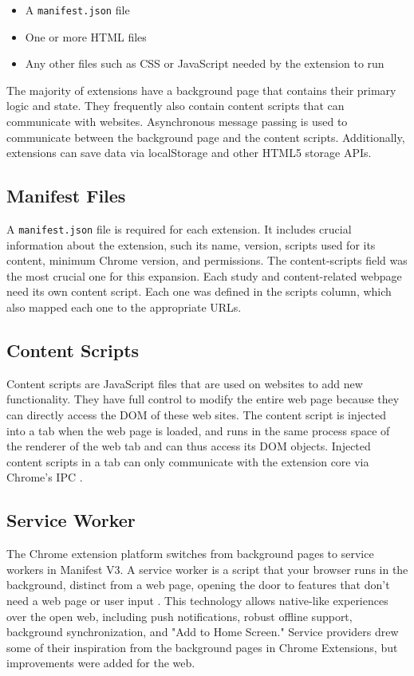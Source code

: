 \begin{itemize}
  \item A \texttt{manifest.json} file
  \item One or more HTML files
  \item Any other files such as CSS or JavaScript needed by the extension to run
\end{itemize}

The majority of extensions have a background page that contains their primary logic and state. They frequently also contain content scripts that can communicate with websites. Asynchronous message passing is used to communicate between the background page and the content scripts. Additionally, extensions can save data via localStorage and other HTML5 storage APIs.

\subsection{Manifest Files}
A \texttt{manifest.json} file is required for each extension. It includes crucial information about the extension, such its name, version, scripts used for its content, minimum Chrome version, and permissions. The content-scripts field was the most crucial one for this expansion. Each study and content-related webpage need its own content script. Each one was defined in the scripts column, which also mapped each one to the appropriate URLs.

\subsection{Content Scripts}
Content scripts are JavaScript files that are used on websites to add new functionality. They have full control to modify the entire web page because they can directly access the DOM of these web sites. The content script is injected into a tab when the web page is loaded, and runs in the same process space of the renderer of the web tab and can thus access its DOM objects. Injected content scripts in a tab can only communicate with the extension core via Chrome's IPC \autocite{liu2012chrome}.

\subsection{Service Worker}
The Chrome extension platform switches from background pages to service workers in Manifest V3. A service worker is a script that your browser runs in the background, distinct from a web page, opening the door to features that don't need a web page or user input \autocite{chrome2021service}. This technology allows native-like experiences over the open web, including push notifications, robust offline support, background synchronization, and "Add to Home Screen." Service providers drew some of their inspiration from the background pages in Chrome Extensions, but improvements were added for the web.

